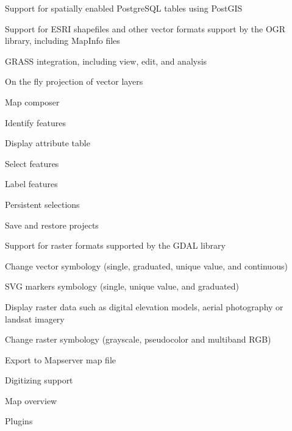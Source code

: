 \begin{compactenum}
\item Support for spatially enabled PostgreSQL tables using PostGIS 
\item Support for ESRI shapefiles and other vector formats support by the
OGR library, including MapInfo files 
\item GRASS integration, including view, edit, and analysis
\item On the fly projection of vector layers
\item Map composer
\item Identify features 
\item Display attribute table 
\item Select features 
\item Label features
\item Persistent selections 
\item Save and restore projects
\item Support for raster formats supported by the GDAL library 
\item Change vector symbology (single, graduated, unique value, and continuous) 
\item SVG markers symbology (single, unique value, and graduated) 
\item Display raster data such as digital elevation models, aerial photography
or landsat imagery 
\item Change raster symbology (grayscale, pseudocolor and multiband RGB) 
\item Export to Mapserver map file 
\item Digitizing support
\item Map overview
\item Plugins 
\end{compactenum}


